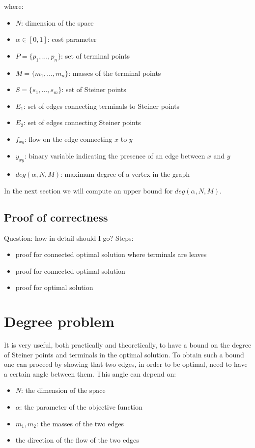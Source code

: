 \documentclass{article}
\begin{document}
    where:
    \begin{itemize}
        \item $N$: dimension of the space
        \item $\alpha \in [0,1]$: cost parameter
        \item $P = \{p_1, \ldots, p_n\}$: set of terminal points
        \item $M = \{m_1, \ldots, m_n\}$: masses of the terminal points
        \item $S = \{s_1, \ldots, s_m\}$: set of Steiner points
        \item $E_1$: set of edges connecting terminals to Steiner points
        \item $E_2$: set of edges connecting Steiner points
        \item $f_{xy}$: flow on the edge connecting $x$ to $y$
        \item $y_{xy}$: binary variable indicating the presence of an edge between $x$ and $y$
        \item $deg(\alpha, N, M)$: maximum degree of a vertex in the graph
    \end{itemize}

    In the next section we will compute an upper bound for $deg(\alpha, N, M)$.

    \subsection{Proof of correctness}
    Question: how in detail should I go?
    Steps:
    \begin{itemize}
        \item proof for connected optimal solution where terminals are leaves
        \item proof for connected optimal solution
        \item proof for optimal solution
    \end{itemize}


    \section{Degree problem}

    It is very useful, both practically and theoretically, to have a bound on the degree of Steiner points and terminals in the optimal solution.
    To obtain such a bound one can proceed by showing that two edges, in order to be optimal, need to have a certain angle between them. This angle can
    depend on:
    \begin{itemize}
        \item $N$: the dimension of the space
        \item $\alpha$: the parameter of the objective function
        \item $m_1, m_2$: the masses of the two edges
        \item the direction of the flow of the two edges
    \end{itemize}
\end{document}
